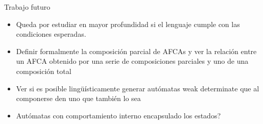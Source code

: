 \documentclass[10pt,xcolor={table,dvipsnames},t]{beamer}
\begin{document}
\begin{frame}{Trabajo futuro}
\begin{itemize}
    \item Queda por estudiar en mayor profundidad si el lenguaje cumple con las condiciones esperadas.
    \item Definir formalmente la composición parcial de AFCAs y ver la relación entre un AFCA obtenido por una serie de composiciones parciales y uno de una composición total
    \item Ver si es posible lingüísticamente generar autómatas weak determinate que al componerse den uno que también lo sea
    \item Autómatas con comportamiento interno encapsulado los estados?
\end{itemize}

    
\end{frame}



\end{document}

